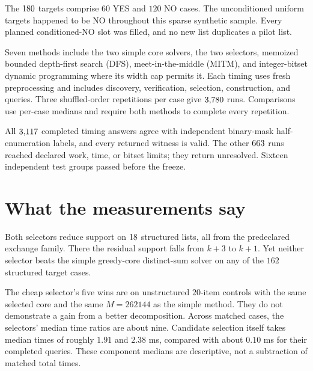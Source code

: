 \documentclass[10pt,english]{article}
\begin{document}
The \(180\) targets comprise \(60\) YES and \(120\) NO cases. The unconditioned uniform targets happened to be NO throughout this sparse synthetic sample. Every planned conditioned-NO slot was filled, and no new list duplicates a pilot list.

Seven methods include the two simple core solvers, the two selectors, memoized bounded depth-first search (DFS), meet-in-the-middle (MITM), and integer-bitset dynamic programming where its width cap permits it. Each timing uses fresh preprocessing and includes discovery, verification, selection, construction, and queries. Three shuffled-order repetitions per case give \(3{,}780\) runs. Comparisons use per-case medians and require both methods to complete every repetition.

All \(3{,}117\) completed timing answers agree with independent binary-mask half-enumeration labels, and every returned witness is valid. The other \(663\) runs reached declared work, time, or bitset limits; they return unresolved. Sixteen independent test groups passed before the freeze.

\section{What the measurements say}
Both selectors reduce support on \(18\) structured lists, all from the predeclared exchange family. There the residual support falls from \(k+3\) to \(k+1\). Yet neither selector beats the simple greedy-core distinct-sum solver on any of the \(162\) structured target cases.

\begin{table}[ht]
\centering
\caption{All completed paired cases. Ratios compare total time with the simple greedy-core distinct-sum solver; smaller than \(1\) favors selection.}
\small

\end{table}

The cheap selector's five wins are on unstructured \(20\)-item controls with the same selected core and the same \(M=262144\) as the simple method. They do not demonstrate a gain from a better decomposition. Across matched cases, the selectors' median time ratios are about nine. Candidate selection itself takes median times of roughly \(1.91\) and \(2.38\) ms, compared with about \(0.10\) ms for their completed queries. These component medians are descriptive, not a subtraction of matched total times.
\end{document}
